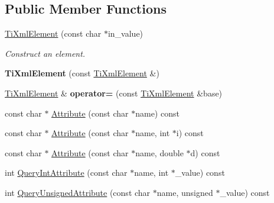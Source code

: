 \subsection*{\-Public \-Member \-Functions}
\begin{DoxyCompactItemize}
\item 
\hypertarget{class_ti_xml_element_a01bc3ab372d35da08efcbbe65ad90c60}{\hyperlink{class_ti_xml_element_a01bc3ab372d35da08efcbbe65ad90c60}{\-Ti\-Xml\-Element} (const char $\ast$in\-\_\-value)}\label{class_ti_xml_element_a01bc3ab372d35da08efcbbe65ad90c60}

\begin{DoxyCompactList}\small\item\em \-Construct an element. \end{DoxyCompactList}\item 
\hypertarget{class_ti_xml_element_a1ca4465f3c2eac6a60e641cd7f1d9f7e}{{\bfseries \-Ti\-Xml\-Element} (const \hyperlink{class_ti_xml_element}{\-Ti\-Xml\-Element} \&)}\label{class_ti_xml_element_a1ca4465f3c2eac6a60e641cd7f1d9f7e}

\item 
\hypertarget{class_ti_xml_element_ad58d300f4cfc0016ffa6861ebb718a0b}{\hyperlink{class_ti_xml_element}{\-Ti\-Xml\-Element} \& {\bfseries operator=} (const \hyperlink{class_ti_xml_element}{\-Ti\-Xml\-Element} \&base)}\label{class_ti_xml_element_ad58d300f4cfc0016ffa6861ebb718a0b}

\item 
const char $\ast$ \hyperlink{class_ti_xml_element_ac1e4691e9375ba4e665dce7e46a50a9c}{\-Attribute} (const char $\ast$name) const 
\item 
const char $\ast$ \hyperlink{class_ti_xml_element_aa9192e80567b5042dbded80b78c44339}{\-Attribute} (const char $\ast$name, int $\ast$i) const 
\item 
const char $\ast$ \hyperlink{class_ti_xml_element_aec4f727f8aa49b51248d80125d173136}{\-Attribute} (const char $\ast$name, double $\ast$d) const 
\item 
int \hyperlink{class_ti_xml_element_aea0bfe471380f281c5945770ddbf52b9}{\-Query\-Int\-Attribute} (const char $\ast$name, int $\ast$\-\_\-value) const 
\item 
\hypertarget{class_ti_xml_element_ae48df644f890ab86fa19839ac401f00d}{int \hyperlink{class_ti_xml_element_ae48df644f890ab86fa19839ac401f00d}{\-Query\-Unsigned\-Attribute} (const char $\ast$name, unsigned $\ast$\-\_\-value) const }\label{class_ti_xml_element_ae48df644f890ab86fa19839ac401f00d}


\end{DoxyCompactItemize}
